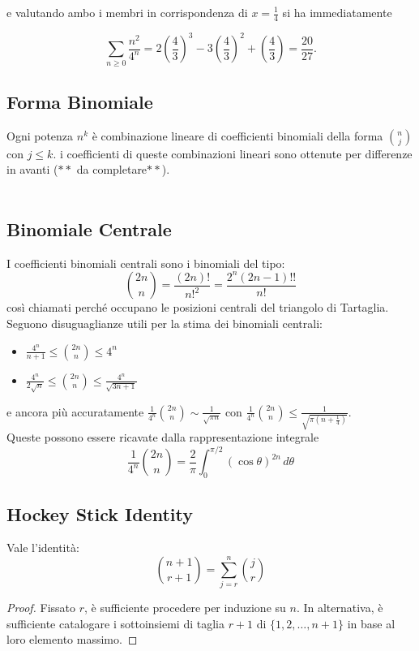 \documentclass[a4paper,twoside]{article}
\theoremstyle{definition}
\numberwithin{theorem}{section}
\begin{document}
e valutando ambo i membri in corrispondenza di $x=\frac{1}{4}$ si ha immediatamente 

$$ \sum_{n\geq 0}\frac{n^2}{4^n} = 2\left(\frac{4}{3}\right)^3-3\left(\frac{4}{3}\right)^2+\left(\frac{4}{3}\right)=\frac{20}{27}.$$

\subsection{Forma Binomiale}
Ogni potenza $n^k$ è combinazione lineare di coefficienti binomiali della forma $\binom{n}{j}$ con $j\leq k$. i coefficienti di queste combinazioni lineari sono ottenute per differenze in avanti ($\ast\ast$ da completare$\ast\ast$).
\\
\\
\subsection{Binomiale Centrale}
I coefficienti binomiali centrali sono i binomiali del tipo:
$$\binom{2n}{n}=\frac{(2n)!}{n!^2}=\frac{2^n(2n-1)!!}{n!}$$
così chiamati perché occupano le posizioni centrali del triangolo di Tartaglia.\\
Seguono disuguaglianze utili per la stima dei binomiali centrali:
    \begin{itemize}
        \item $\frac{4^n}{n+1}\leq\binom{2n}{n}\leq4^n$
        \item $\frac{4^n}{2\sqrt{n}}\leq\binom{2n}{n}\leq\frac{4^n}{\sqrt{3n+1}}$
    \end{itemize}
e ancora più accuratamente $\frac{1}{4^n}\binom{2n}{n}\sim\frac{1}{\sqrt{\pi n}}$ con $\frac{1}{4^n}\binom{2n}{n}\leq \frac{1}{\sqrt{\pi\left(n+\frac{1}{4}\right)}}$.\\ Queste possono essere ricavate dalla rappresentazione integrale 
$$ \frac{1}{4^n}\binom{2n}{n} = \frac{2}{\pi}\int_{0}^{\pi/2}\left(\cos\theta\right)^{2n}\,d\theta $$
    
\subsection{Hockey Stick Identity}
Vale l'identità:
$$\binom{n+1}{r+1}=\sum_{j=r}^{n}\binom{j}{r}$$
\begin{proof}
 Fissato $r$, è sufficiente procedere per induzione su $n$. In alternativa, è sufficiente catalogare i sottoinsiemi di taglia $r+1$ di $\{1,2,\ldots,n+1\}$ in base al loro elemento massimo.
\end{proof}
\end{document}
